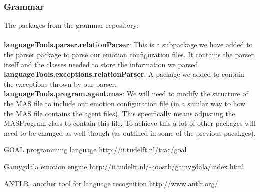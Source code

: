 \documentclass[]{article}
\begin{document}
\subsubsection{Grammar}
The packages from the grammar repository: \\ \\
\textbf{languageTools.parser.relationParser}: This is a subpackage we have added to the parser package to parse our emotion configuration files. It contains the parser itself and the classes needed to store the information we parsed.\\
\textbf{languageTools.exceptions.relationParser}: A package we added to contain the exceptions thrown by our parser. \\
\textbf{languageTools.program.agent.mas}: We will need to modify the structure of the MAS file to include our emotion configuration file (in a similar way to how the MAS file contains the agent files). This specifically means adjusting the MASProgram class to contain this file. To achieve this a lot of other packages will need to be changed as well though (as outlined in some of the previous pacakges).\\



\clearpage
\printglossaries
\begin{thebibliography}{9}
	
	GOAL programming language
	\url{http://ii.tudelft.nl/trac/goal}
	
	Gamygdala emotion engine
	\url{http://ii.tudelft.nl/~joostb/gamygdala/index.html}
	
	ANTLR, another tool for language recognition
	\url{http://www.antlr.org/}
	
	
\end{thebibliography}
\end{document}
